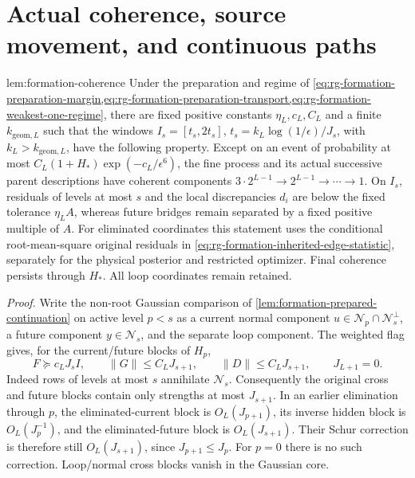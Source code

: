 \section{Actual coherence, source movement, and continuous paths}
\label{sec:rg-formation-dynamics-transfer}

{lem:formation-coherence}
Under the preparation and regime of
\cref{eq:rg-formation-preparation-margin,eq:rg-formation-preparation-transport,eq:rg-formation-weakest-one-regime},
there are fixed positive constants $\eta_L,c_L,C_L$ and a finite
$k_{\mathrm{geom},L}$ such that the windows
$I_s=[t_s,2t_s]$, $t_s=k_L\log(1/\epsilon)/J_s$, with
$k_L>k_{\mathrm{geom},L}$, have the following property. Except on an
event of probability at most
$C_L(1+H_*)\exp(-c_L/\epsilon^6)$, the fine process and its actual
successive parent descriptions have coherent components
$3\cdot2^{L-1}\to2^{L-1}\to\cdots\to1$. On $I_s$, residuals of
levels at most $s$ and the local discrepancies $d_i$ are below the
fixed tolerance $\eta_LA$, whereas future bridges remain separated
by a fixed positive multiple of $A$. For eliminated coordinates this
statement uses the conditional root-mean-square original residuals
in \cref{eq:rg-formation-inherited-edge-statistic}, separately for
the physical posterior and restricted optimizer. Final coherence
persists through $H_*$. All loop coordinates remain retained. 

\emph{Proof.}
Write the non-root Gaussian comparison of
\cref{lem:formation-prepared-continuation} on active level $p<s$
as a current normal component $u\in\mathcal N_p\cap\mathcal N_s^\perp$,
a future component $y\in\mathcal N_s$, and the separate loop
component. The weighted flag gives, for the current/future blocks
of $H_p$,
\begin{equation}
 F\succeq c_LJ_sI,
 \qquad \|G\|\le C_LJ_{s+1},
 \qquad \|D\|\le C_LJ_{s+1},
 \qquad J_{L+1}=0.
 \label{eq:rg-formation-current-future-blocks}
\end{equation}
Indeed rows of levels at most $s$ annihilate $\mathcal N_s$.
Consequently the original cross and future blocks contain only
strengths at most $J_{s+1}$. In an earlier elimination through $p$,
the eliminated-current block is $O_L(J_{p+1})$, its inverse hidden
block is $O_L(J_p^{-1})$, and the eliminated-future block is
$O_L(J_{s+1})$. Their Schur correction is therefore still
$O_L(J_{s+1})$, since $J_{p+1}\le J_p$. For $p=0$ there is no such
correction. Loop/normal cross blocks vanish in the Gaussian core.

